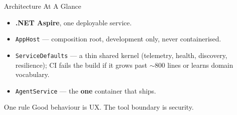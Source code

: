 \documentclass[aspectratio=169]{beamer}
\newcommand{\code}[1]{\texttt{#1}}
\begin{document}
\begin{frame}{Architecture At A Glance}
  \begin{itemize}
    \item \textbf{.NET Aspire}, one deployable service.
    \item \code{AppHost} --- composition root, development only, never
      containerised.
    \item \code{ServiceDefaults} --- a thin shared kernel (telemetry, health,
      discovery, resilience); CI fails the build if it grows past
      $\sim$800 lines or learns domain vocabulary.
    \item \code{AgentService} --- the \textbf{one} container that ships.
  \end{itemize}
  \vspace{0.8em}
  \begin{block}{One rule}
    Good behaviour is UX. The tool boundary is security.
  \end{block}
\end{frame}
\end{document}
